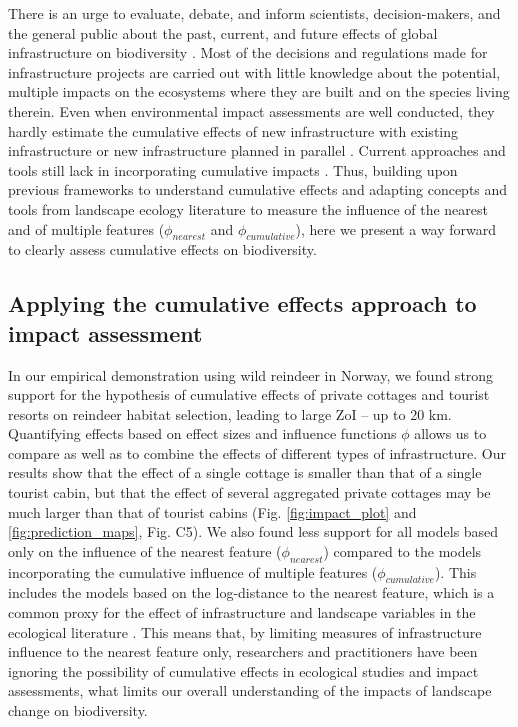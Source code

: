 \documentclass[titlepage]{article}
\begin{document}
There is an urge to evaluate, debate, and inform scientists, decision-makers, and the general public about the past, current, and future effects of global infrastructure on biodiversity \citep{laurance_conservation_2018}. Most of the decisions and regulations made for infrastructure projects are carried out with little knowledge about the potential, multiple impacts on the ecosystems where they are built and on the species living therein. Even when environmental impact assessments are well conducted, they hardly estimate the cumulative effects of new infrastructure with existing infrastructure or new infrastructure planned in parallel \citep{laurance_roads_2017, johnson_regulating_2011}. Current approaches and tools still lack in incorporating cumulative impacts \citep[but see][for recent advances]{gillingham_integration_2016}. Thus, building upon previous frameworks to understand cumulative effects \citep{naugle_unifying_2011} and adapting concepts and tools from landscape ecology literature to measure the influence of the nearest and of multiple features ($\phi_{nearest}$ and $\phi_{cumulative}$), here we present a way forward to clearly assess cumulative effects on biodiversity. 

\subsection{Applying the cumulative effects approach to impact assessment}

In our empirical demonstration using wild reindeer in Norway, we found strong support for the hypothesis of cumulative effects of private cottages and tourist resorts on reindeer habitat selection, leading to large ZoI -- up to 20 km. Quantifying effects based on effect sizes and influence functions $\phi$ allows us to compare as well as to combine the effects of different types of infrastructure. Our results show that the effect of a single cottage is smaller than that of a single tourist cabin, but that the effect of several aggregated private cottages may be much larger than that of tourist cabins (Fig. \ref{fig:impact_plot} and \ref{fig:prediction_maps}, Fig. C5). We also found less support for all models based only on the influence of the nearest feature ($\phi_{nearest}$) compared to the models incorporating the cumulative influence of multiple features ($\phi_{cumulative}$). This includes the models based on the log-distance to the nearest feature, which is a common proxy for the effect of infrastructure and landscape variables in the ecological literature \citep[e.g.][]{torres_assessing_2016,polfus_identifying_2011}. This means that, by limiting measures of infrastructure influence to the nearest feature only, researchers and practitioners have been ignoring the possibility of cumulative effects in ecological studies and impact assessments, what limits our overall understanding of the impacts of landscape change on biodiversity.
\end{document}
